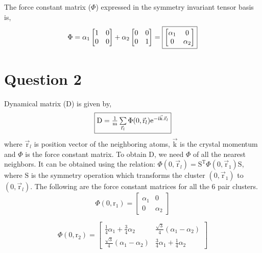 \documentclass[a4paper]{article}
\begin{document}
The force constant matrix ($\Phi$) expressed in the symmetry invariant tensor basis is,
\begin{equation}
    \Phi = \alpha_1 \begin{bmatrix} 1 & 0 \\ 0 & 0 \end{bmatrix} + \alpha_2 \begin{bmatrix} 0 & 0 \\ 0 & 1 \end{bmatrix} = \fbox{$\begin{bmatrix} \alpha_1 & 0 \\ 0 & \alpha_2 \end{bmatrix}$} 
\end{equation}
\section*{Question 2}
Dynamical matrix ($\mathrm{D}$) is given by,
\begin{equation}
    \fbox{$\mathrm{D} = \frac{1}{\mathrm{m}} \sum\limits_{\vec{\mathrm{r}}_l} \Phi(0,\vec{\mathrm{r}}_l) \mathrm{e}^{-\mathrm{i}\vec{\mathrm{k}}.\vec{\mathrm{r}}_l}$}
\end{equation}
where $\vec{\mathrm{r}}_l$ is position vector of the neighboring atoms, $\vec{\mathrm{k}}$ is the crystal momentum and $\Phi$ is the force constant matrix.
To obtain $\mathrm{D}$, we need $\Phi$ of all the nearest neighbors. It can be obtained using the relation: $\Phi(0,\vec{\mathrm{r}}_l) = \mathrm{S}^\mathrm{T}\Phi(0,\vec{\mathrm{r}}_1)\mathrm{S}$, where $\mathrm{S}$ is the symmetry operation which transforms the cluster $(0,\vec{\mathrm{r}}_1)$ to $(0,\vec{\mathrm{r}}_l)$. The following are the force constant matrices for all the 6 pair clusters.\\
\begin{equation*}
    \Phi(0,\mathrm{r}_1) = \begin{bmatrix} \alpha_1 & 0\\ 0 & \alpha_2 \end{bmatrix} 
\end{equation*}

\begin{equation*}
    \Phi(0,\mathrm{r}_2) = \begin{bmatrix} \frac{1}{4}\alpha_1 + \frac{3}{4}\alpha_2 & \frac{\sqrt{3} }{4}(\alpha_1 - \alpha_2) \\ \frac{\sqrt{3} }{4}(\alpha_1 - \alpha_2) & \frac{3}{4}\alpha_1 + \frac{1}{4}\alpha_2   \end{bmatrix} 
\end{equation*}
\end{document}
